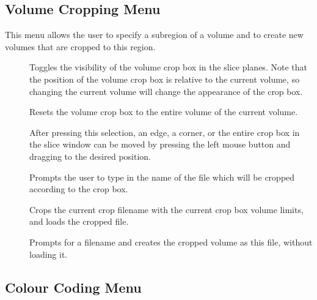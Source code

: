 \subsection{Volume Cropping Menu}

This menu allows the user to specify a subregion of a volume and to
create new volumes that are cropped to this region.

\begin{description}
\item[]  Toggles the visibility
       of the volume crop box in the slice planes.  Note that the position
       of the volume crop box is relative to the current volume, so changing
       the current volume will change the appearance of the crop box.
\item[]  Resets the
       volume crop box to the entire volume of the current volume.
\item[]  After pressing this
       selection, an edge, a corner, or the entire crop box in the slice
       window can be moved
       by pressing the left mouse button and dragging to the desired
       position.
\item[]  Prompts the
       user to type in the name of the file which will be cropped according to
       the crop box.
\item[]  Crops the current
       crop filename with the current crop box volume limits, and loads the
       cropped file.
\item[]  Prompts for a
       filename and creates the cropped volume as this file, without
       loading it.
\end{description}

\subsection{Colour Coding Menu}

